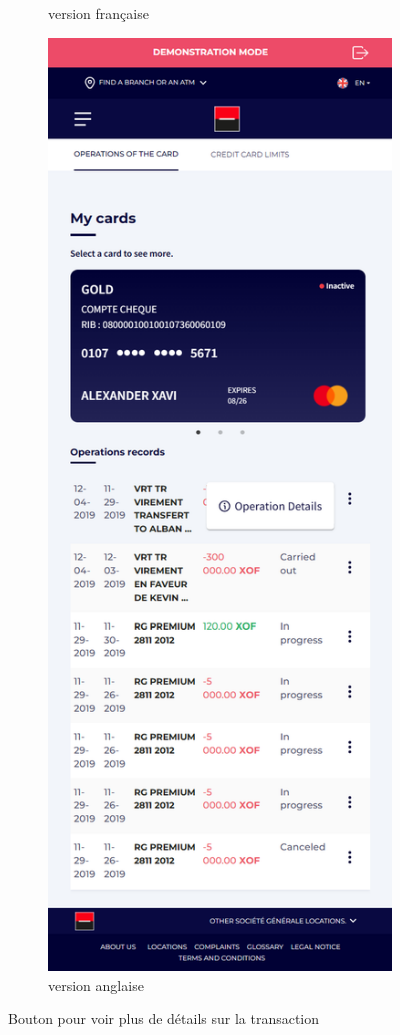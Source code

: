 \begin{figure}[!ht]
\begin{subfigure}[b]{0.49\textwidth}
        \caption{version française}
    \end{subfigure}
    \hfill
    \begin{subfigure}[b]{0.49\textwidth}
        \centering
        \includegraphics[width=\textwidth]{images/screens/cards/mob-button.png}
        \caption{version anglaise}
    \end{subfigure}
       \caption{Bouton pour voir plus de détails sur la transaction}
\end{figure}

